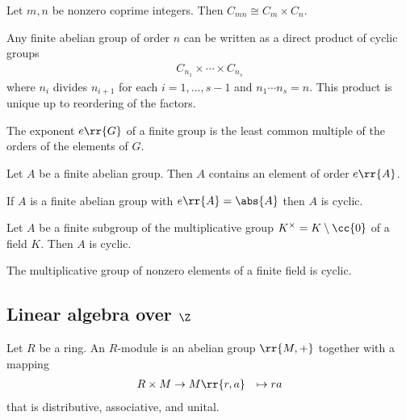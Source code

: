 \documentclass{article}
\begin{document}
\begin{theorem}
  Let $m,n$ be nonzero coprime integers. Then $C_{mn}\cong C_m\times C_n$.
\end{theorem}

\begin{theorem}
  Any finite abelian group of order $n$ can be written as a direct product of cyclic groups
  \begin{align*}
    C_{n_1}\times\cdots\times C_{n_s}
  \end{align*}
  where $n_i$ divides $n_{i+1}$ for each $i=1,...,s-1$ and $n_1\cdots n_s=n$. This product is
  unique up to reordering of the factors.
\end{theorem}

\begin{definition}
  The exponent $e\rr{G}$ of a finite group is the least common multiple of the orders of the
  elements of $G$.
\end{definition}

\begin{lemma}
  Let $A$ be a finite abelian group. Then $A$ contains an element of order $e\rr{A}$.
\end{lemma}

\begin{corollary}
  If $A$ is a finite abelian group with $e\rr{A}=\abs{A}$ then $A$ is cyclic.
\end{corollary}

\begin{theorem}
  Let $A$ be a finite subgroup of the multiplicative group $K^\times = K\setminus\cc{0}$
  of a field $K$. Then $A$ is cyclic.
\end{theorem}

\begin{corollary}
  The multiplicative group of nonzero elements of a finite field is cyclic.
\end{corollary}

\subsection{Linear algebra over $\Z$}\label{sec:linear-algebra-over-z}

\begin{definition}\label{def:module}
  Let $R$ be a ring. An $R$-module is an abelian group $\rr{M,+}$ together with a mapping
  \begin{align*}
    R\times M&\to M
    \rr{r,a} &\mapsto ra
  \end{align*}
  that is distributive, associative, and unital.
\end{definition}
\end{document}
